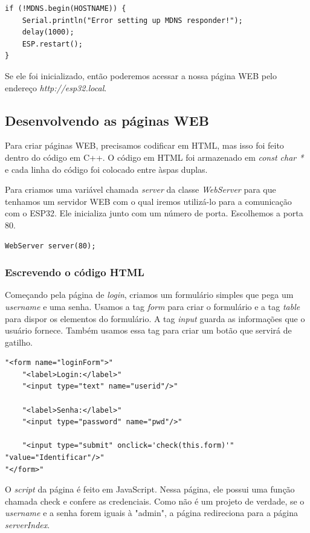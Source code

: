 \documentclass[12pt]{article}
\begin{document}
\begin{lstlisting}
if (!MDNS.begin(HOSTNAME)) { 
    Serial.println("Error setting up MDNS responder!");
    delay(1000);
    ESP.restart();        
}
\end{lstlisting}

Se ele foi inicializado, então poderemos acessar a nossa página WEB pelo endereço \textit{http://esp32.local}.

\subsection{Desenvolvendo as páginas WEB}

Para criar páginas WEB, precisamos codificar em HTML, mas isso foi feito dentro do código em C++. O código em HTML foi armazenado em \textit{const char *} e cada linha do código foi colocado entre àspas duplas.

Para criamos uma variável chamada \textit{server} da classe \textit{WebServer} para que tenhamos um servidor WEB com o qual iremos utilizá-lo para a comunicação com o ESP32. Ele inicializa junto com um número de porta. Escolhemos a porta 80.

\begin{lstlisting}
WebServer server(80);
\end{lstlisting}

\subsubsection{Escrevendo o código HTML}

Começando pela página de \textit{login}, criamos um formulário simples que pega um \textit{username} e uma senha. Usamos a tag \textit{form} para criar o formulário e a tag \textit{table} para dispor os elementos do formulário. A tag \textit{input} guarda as informações que o usuário fornece. Também usamos essa tag para criar um botão que servirá de gatilho.

\begin{lstlisting}
"<form name="loginForm">"
    "<label>Login:</label>"
    "<input type="text" name="userid"/>"

    "<label>Senha:</label>"
    "<input type="password" name="pwd"/>"

    "<input type="submit" onclick='check(this.form)'" "value="Identificar"/>"
"</form>"
\end{lstlisting}

O \textit{script} da página é feito em JavaScript. Nessa página, ele possui uma função chamada check e confere as credenciais. Como não é um projeto de verdade, se o \textit{username} e a senha forem iguais à "admin", a página redireciona para a página \textit{serverIndex}.
\end{document}
